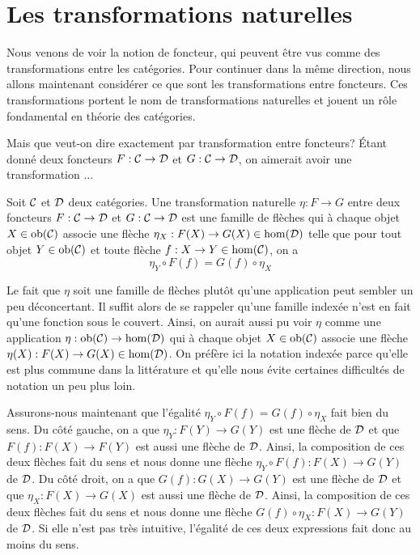 \section{Les transformations naturelles}
Nous venons de voir la notion de foncteur, qui peuvent être vus comme
des transformations entre les catégories. Pour continuer dans la même
direction, nous allons maintenant considérer ce que sont les transformations
entre foncteurs. Ces transformations portent le nom de transformations
naturelles et jouent un rôle fondamental en théorie des catégories.

Mais que veut-on dire exactement par transformation entre foncteurs?
Étant donné deux foncteurs $F : \mathcal{C} \to \mathcal{D}$ et $G : \mathcal{C} \to \mathcal{D}$, on aimerait
avoir une transformation ...


\begin{définition}
    Soit $\mathcal{C}$ et $\mathcal{D}$ deux catégories. Une transformation naturelle
    $\eta : F \to G$ entre deux foncteurs $F : \mathcal{C} \to \mathcal{D}$ et $G : \mathcal{C} \to \mathcal{D}$
    est une famille de flèches qui à chaque objet $X \in \mathrm{ob}(\mathcal{C})$ associe une
    flèche $\eta_X : F(X) \to G(X) \in \hom(\mathcal{D})$ telle que pour tout objet
    $Y \in \mathrm{ob}(\mathcal{C})$ et toute flèche $f : X \to Y \in \hom(\mathcal{C})$, on a
    \[
        \eta_Y \circ F(f) = G(f) \circ \eta_X
    \]
\end{définition}

Le fait que $\eta$ soit une famille de flèches plutôt qu'une application
peut sembler un peu déconcertant. Il suffit alors de se rappeler qu'une
famille indexée n'est en fait qu'une fonction sous le couvert. Ainsi, on
aurait aussi pu voir $\eta$ comme une application $\eta : \mathrm{ob}(\mathcal{C}) \to \hom(\mathcal{D})$
qui à chaque objet $X \in \mathrm{ob}(\mathcal{C})$ associe une flèche
$\eta(X) : F(X) \to G(X) \in \hom(\mathcal{D})$. On préfère ici la notation indexée
parce qu'elle est plus commune dans la littérature et qu'elle nous évite
certaines difficultés de notation un peu plus loin.

Assurons-nous maintenant que l'égalité $\eta_Y \circ F(f) = G(f) \circ \eta_X$
fait bien du sens. Du côté gauche, on a que $\eta_Y : F(Y) \to G(Y)$ est une
flèche de $\mathcal{D}$ et que $F(f) : F(X) \to F(Y)$ est aussi une flèche de $\mathcal{D}$.
Ainsi, la composition de ces deux flèches fait du sens et nous donne une flèche
$\eta_Y \circ F(f) : F(X) \to G(Y)$ de $\mathcal{D}$. Du côté droit, on a que
$G(f) : G(X) \to G(Y)$ est une flèche de $\mathcal{D}$ et que $\eta_X : F(X) \to G(X)$
est aussi une flèche de $\mathcal{D}$. Ainsi, la composition de ces deux flèches fait
du sens et nous donne une flèche $G(f) \circ \eta_X : F(X) \to G(Y)$ de $\mathcal{D}$.
Si elle n'est pas très intuitive, l'égalité de ces deux expressions fait donc
au moins du sens.

